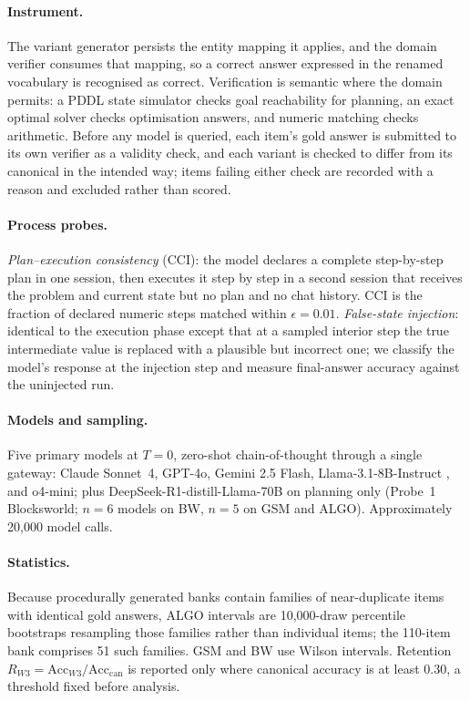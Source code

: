\documentclass{article}
\begin{document}
\paragraph{Instrument.} The variant generator persists the entity mapping it
applies, and the domain verifier consumes that mapping, so a correct answer
expressed in the renamed vocabulary is recognised as correct. Verification is
semantic where the domain permits: a PDDL state simulator checks goal reachability
for planning, an exact optimal solver checks optimisation answers, and numeric
matching checks arithmetic. Before any model is queried, each item's gold answer is
submitted to its own verifier as a validity check, and each variant is checked to
differ from its canonical in the intended way; items failing either check are
recorded with a reason and excluded rather than scored.

\paragraph{Process probes.} \emph{Plan--execution consistency} (CCI): the model
declares a complete step-by-step plan in one session, then executes it step by step
in a second session that receives the problem and current state but no plan and no
chat history. CCI is the fraction of declared numeric steps matched within
$\epsilon = 0.01$. \emph{False-state injection}: identical to the execution phase
except that at a sampled interior step the true intermediate value is replaced with
a plausible but incorrect one; we classify the model's response at the injection
step and measure final-answer accuracy against the uninjected run.

\paragraph{Models and sampling.} Five primary models at $T = 0$, zero-shot chain-of-thought
through a single gateway: Claude Sonnet~4, GPT-4o, Gemini 2.5 Flash,
Llama-3.1-8B-Instruct \citep{dubey2024llama}, and o4-mini; plus
DeepSeek-R1-distill-Llama-70B \citep{guo2025deepseek} on planning only
(Probe~1 Blocksworld; $n{=}6$ models on BW, $n{=}5$ on GSM and ALGO). Approximately
20{,}000 model calls.

\paragraph{Statistics.} Because procedurally generated banks contain families of
near-duplicate items with identical gold answers, ALGO intervals are 10{,}000-draw
percentile bootstraps resampling those families rather than individual items; the
110-item bank comprises 51 such families. GSM and BW use Wilson intervals.
Retention $R_{W3} = \mathrm{Acc}_{W3}/\mathrm{Acc}_{\mathrm{can}}$ is reported only
where canonical accuracy is at least $0.30$, a threshold fixed before analysis.
\end{document}
